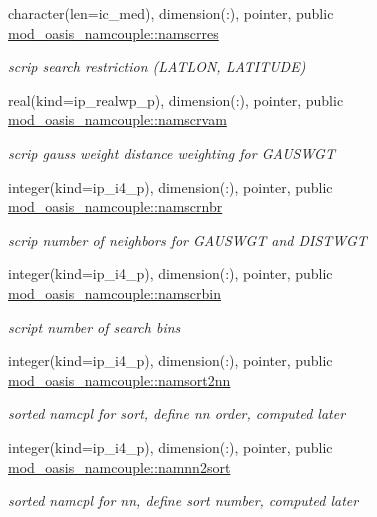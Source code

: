 \begin{DoxyCompactItemize}
character(len=ic\+\_\+med), dimension(\+:), pointer, public \hyperlink{namespacemod__oasis__namcouple_a6a95ddbbbc615e0257d93d05e4546239}{mod\+\_\+oasis\+\_\+namcouple\+::namscrres}
\begin{DoxyCompactList}\small\item\em scrip search restriction (L\+A\+T\+L\+ON, L\+A\+T\+I\+T\+U\+DE) \end{DoxyCompactList}\item 
real(kind=ip\+\_\+realwp\+\_\+p), dimension(\+:), pointer, public \hyperlink{namespacemod__oasis__namcouple_a45b410743ce74a9824d44b329ba323ba}{mod\+\_\+oasis\+\_\+namcouple\+::namscrvam}
\begin{DoxyCompactList}\small\item\em scrip gauss weight distance weighting for G\+A\+U\+S\+W\+GT \end{DoxyCompactList}\item 
integer(kind=ip\+\_\+i4\+\_\+p), dimension(\+:), pointer, public \hyperlink{namespacemod__oasis__namcouple_a20d614468823744b82118ee8cf2df852}{mod\+\_\+oasis\+\_\+namcouple\+::namscrnbr}
\begin{DoxyCompactList}\small\item\em scrip number of neighbors for G\+A\+U\+S\+W\+GT and D\+I\+S\+T\+W\+GT \end{DoxyCompactList}\item 
integer(kind=ip\+\_\+i4\+\_\+p), dimension(\+:), pointer, public \hyperlink{namespacemod__oasis__namcouple_a728405e8f669b58d00c189abf8b62437}{mod\+\_\+oasis\+\_\+namcouple\+::namscrbin}
\begin{DoxyCompactList}\small\item\em script number of search bins \end{DoxyCompactList}\item 
integer(kind=ip\+\_\+i4\+\_\+p), dimension(\+:), pointer, public \hyperlink{namespacemod__oasis__namcouple_a4555b14f38928b7f0fb7f77b9c42d0a0}{mod\+\_\+oasis\+\_\+namcouple\+::namsort2nn}
\begin{DoxyCompactList}\small\item\em sorted namcpl for sort, define nn order, computed later \end{DoxyCompactList}\item 
integer(kind=ip\+\_\+i4\+\_\+p), dimension(\+:), pointer, public \hyperlink{namespacemod__oasis__namcouple_a0ace7c451d8658759b9c8d871926a76e}{mod\+\_\+oasis\+\_\+namcouple\+::namnn2sort}
\begin{DoxyCompactList}\small\item\em sorted namcpl for nn, define sort number, computed later \end{DoxyCompactList}\item 

\end{DoxyCompactItemize}

